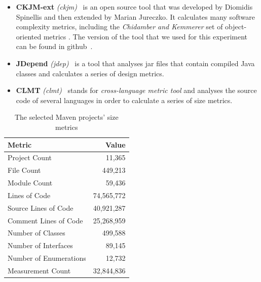\documentclass{sig-alternate}
\begin{document}
\begin{itemize}
  \item \textbf{CKJM-ext} \textit{(ckjm)}~\cite{Spi05g} is an open source tool that was developed by Diomidis Spinellis and then extended by Marian Jureczko. It calculates many software complexity metrics, including the \textit{Chidamber and Kemmerer} set of object-oriented metrics \cite{CHKE94}. The version of the tool that we used for this experiment can be found in github~\cite{CKJM}.

  \item \textbf{JDepend} \textit{(jdep)}~\cite{JDEPEND} is a tool that analyses {\sc jar} files that contain compiled Java classes and calculates a series of design metrics.

  \item \textbf{CLMT} \textit{(clmt)}~\cite{SGKL09} stands for \textit{cross-language metric tool} and analyses the source code of several languages in order to calculate a series of size metrics.
\end{itemize}


\begin{table}
\centering
\caption{The selected Maven projects' size metrics}
\label{tbl:oss-size-metrics}
\begin{tabular}{l r}
 \hline
\textbf{Metric} & \textbf{Value}\\
\hline
Project Count & 11,365\\
File Count & 449,213\\
Module Count & 59,436\\
Lines of Code & 74,565,772\\
Source Lines of Code & 40,921,287\\
Comment Lines of Code & 25,268,959\\
Number of Classes & 499,588\\
Number of Interfaces & 89,145\\
Number of Enumerations & 12,732\\
Measurement Count & 32,844,836\\
\hline
\end{tabular}
\end{table}
\end{document}
